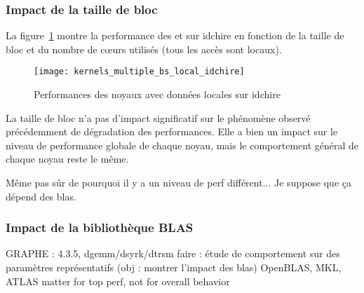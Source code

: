 


\subsubsection{Impact de la taille de bloc}

La figure~\ref{fig:contribs:apps:cholesky:perf-multiple-bs-idchire} montre la performance des \gemm et \potrf sur idchire en fonction de la taille de bloc et du nombre de cœurs utilisés (tous les accès sont locaux).

\begin{figure}[ht]
  \centering
  \texttt{[image: kernels\_multiple\_bs\_local\_idchire]}
  \caption{Performances des noyaux avec données locales sur idchire}\label{fig:contribs:apps:cholesky:perf-multiple-bs-idchire}
\end{figure}

La taille de bloc n'a pas d'impact significatif sur le phénomène observé précédemment de dégradation des performances.
Elle a bien un impact sur le niveau de performance globale de chaque noyau, mais le comportement général de chaque noyau reste le même.


\begin{todo}
  Même pas sûr de pourquoi il y a un niveau de perf différent... Je suppose que ça dépend des blas.
\end{todo}



\subsubsection{Impact de la bibliothèque BLAS}

\begin{todo}
GRAPHE : 4.3.5, dgemm/dsyrk/dtrsm faire : étude de comportement sur des paramètres représentatifs (obj : montrer l'impact des blas)
OpenBLAS, MKL, ATLAS
matter for top perf, not for overall behavior
\end{todo}


